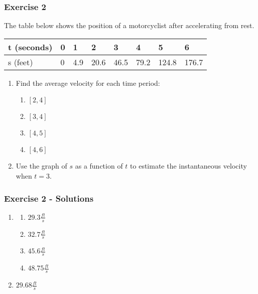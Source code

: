 \documentclass[12pt]{beamer}
\begin{document}
\begin{frame}
	\frametitle{Exercise 2}
	\vspace*{\fill}
	\initclock
	The table below shows the position of a motorcyclist after accelerating from rest.
	\begin{table}[]
		\begin{tabular}{l|l|l|l|l|l|l|l}
			t (seconds) & 0 & 1   & 2    & 3    & 4    & 5     & 6     \\ \hline
			s (feet)    & 0 & 4.9 & 20.6 & 46.5 & 79.2 & 124.8 & 176.7
		\end{tabular}
	\end{table}
	\vspace*{\fill}
	\vspace*{\fill}
	\begin{enumerate}
		\item Find the average velocity for each time period:
		      \begin{multicols}{4}
			      \begin{enumerate}
				      \item $[2, 4]$
				      \item $[3, 4]$
				      \item $[4, 5]$
				      \item $[4, 6]$
			      \end{enumerate}
		      \end{multicols}
		      \vspace*{\fill}
		\item Use the graph of $s$ as a function of $t$ to estimate the instantaneous velocity when $t=3$.
	\end{enumerate}
	\vspace*{\fill}
	\vspace*{\fill}
	\vspace*{\fill}
	\vspace*{\fill}
	\crono
\end{frame}
\begin{frame}
	\frametitle{Exercise 2 - Solutions}
	\vspace*{\fill}
	\vspace*{\fill}
	\begin{enumerate}
		\item
		      \begin{multicols}{4}
			      \begin{enumerate}
				      \item $29.3\tfrac{ft}{s}$
				      \item $32.7\tfrac{ft}{s}$
				      \item $45.6\tfrac{ft}{s}$
				      \item $48.75\tfrac{ft}{s}$
			      \end{enumerate}
		      \end{multicols}
		      \vspace*{\fill}
		\item $29.68\tfrac{ft}{s}$
	\end{enumerate}
	\vspace*{\fill}
	\vspace*{\fill}
	\vspace*{\fill}
	\vspace*{\fill}
\end{frame}
\end{document}
